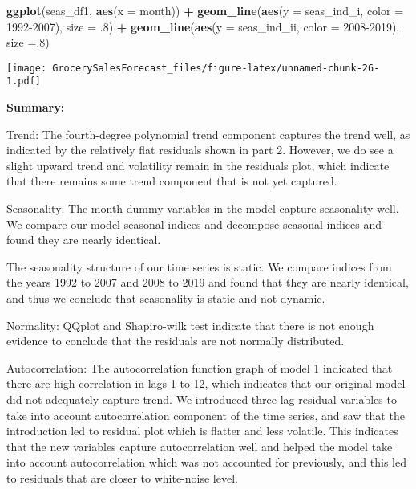 \documentclass[
]{article}
\newenvironment{Shaded}{\begin{snugshade}}{\end{snugshade}}
\newcommand{\AttributeTok}[1]{\textcolor[rgb]{0.13,0.29,0.53}{#1}}
\newcommand{\DecValTok}[1]{\textcolor[rgb]{0.00,0.00,0.81}{#1}}
\newcommand{\FunctionTok}[1]{\textcolor[rgb]{0.13,0.29,0.53}{\textbf{#1}}}
\newcommand{\NormalTok}[1]{#1}
\newcommand{\SpecialCharTok}[1]{\textcolor[rgb]{0.81,0.36,0.00}{\textbf{#1}}}
\newcommand{\StringTok}[1]{\textcolor[rgb]{0.31,0.60,0.02}{#1}}
\begin{document}
\begin{Shaded}
\begin{Highlighting}[]
\FunctionTok{ggplot}\NormalTok{(seas\_df1, }\FunctionTok{aes}\NormalTok{(}\AttributeTok{x =}\NormalTok{ month)) }\SpecialCharTok{+} 
  \FunctionTok{geom\_line}\NormalTok{(}\FunctionTok{aes}\NormalTok{(}\AttributeTok{y =}\NormalTok{ seas\_ind\_i, }\AttributeTok{color =} \StringTok{\textquotesingle{}1992{-}2007\textquotesingle{}}\NormalTok{), }\AttributeTok{size =}\NormalTok{ .}\DecValTok{8}\NormalTok{) }\SpecialCharTok{+} 
  \FunctionTok{geom\_line}\NormalTok{(}\FunctionTok{aes}\NormalTok{(}\AttributeTok{y =}\NormalTok{ seas\_ind\_ii, }\AttributeTok{color =} \StringTok{\textquotesingle{}2008{-}2019\textquotesingle{}}\NormalTok{), }\AttributeTok{size =}\NormalTok{.}\DecValTok{8}\NormalTok{)}
\end{Highlighting}
\end{Shaded}

\texttt{[image: GrocerySalesForecast\_files/figure-latex/unnamed-chunk-26-1.pdf]}

\textbf{Summary: }

Trend: The fourth-degree polynomial trend component captures the trend
well, as indicated by the relatively flat residuals shown in part 2.
However, we do see a slight upward trend and volatility remain in the
residuals plot, which indicate that there remains some trend component
that is not yet captured.

Seasonality: The month dummy variables in the model capture seasonality
well. We compare our model seasonal indices and decompose seasonal
indices and found they are nearly identical.

The seasonality structure of our time series is static. We compare
indices from the years 1992 to 2007 and 2008 to 2019 and found that they
are nearly identical, and thus we conclude that seasonality is static
and not dynamic.

Normality: QQplot and Shapiro-wilk test indicate that there is not
enough evidence to conclude that the residuals are not normally
distributed.

Autocorrelation: The autocorrelation function graph of model 1 indicated
that there are high correlation in lags 1 to 12, which indicates that
our original model did not adequately capture trend. We introduced three
lag residual variables to take into account autocorrelation component of
the time series, and saw that the introduction led to residual plot
which is flatter and less volatile. This indicates that the new
variables capture autocorrelation well and helped the model take into
account autocorrelation which was not accounted for previously, and this
led to residuals that are closer to white-noise level.
\end{document}
